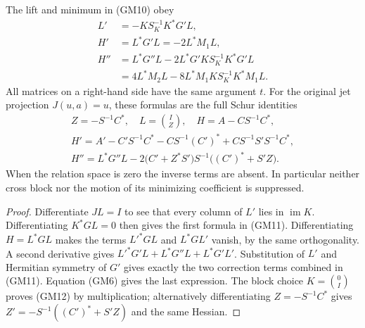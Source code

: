 \begin{theorem}
The lift and minimum in (GM10) obey
\begin{equation}\tag{GM11}
 \begin{split}
 L'&=-K S_K^{-1}K^*G'L,\\
 H'&=L^*G'L=-2L^*M_1L,\\
 H''&=L^*G''L-2L^*G'K S_K^{-1}K^*G'L\\
     &=4L^*M_2L-8L^*M_1K S_K^{-1}K^*M_1L.
 \end{split}
\end{equation}
All matrices on a right-hand side have the same argument $t$.
For the original jet projection $J(u,a)=u$, these formulas are the
full Schur identities
\begin{equation}\tag{GM12}
 \begin{gathered}
 Z=-S^{-1}C^*,\quad L=\binom{I}{Z},\quad H=A-CS^{-1}C^*,\\
 H'=A'-C'S^{-1}C^*-CS^{-1}(C')^*
                       +CS^{-1}S'S^{-1}C^*,\\
 H''=L^*G''L
     -2\bigl(C'+Z^*S'\bigr)S^{-1}\bigl((C')^*+S'Z\bigr).
 \end{gathered}
\end{equation}
When the relation space is zero the inverse terms are absent.
In particular neither cross block nor the motion of its minimizing
coefficient is suppressed.
\end{theorem}
\begin{proof}
Differentiate $JL=I$ to see that every column of $L'$ lies in
$\operatorname{im}K$.  Differentiating $K^*GL=0$ then gives the first
formula in (GM11).  Differentiating $H=L^*GL$ makes the terms
$L'^*GL$ and $L^*GL'$ vanish, by the same orthogonality.  A second
derivative gives $L'^*G'L+L^*G''L+L^*G'L'$.  Substitution of $L'$
and Hermitian symmetry of $G'$ gives exactly the two correction terms
combined in (GM11).  Equation (GM6) gives the last expression.
The block choice $K=\binom0I$ proves (GM12) by multiplication;
alternatively differentiating $Z=-S^{-1}C^*$ gives
$Z'=-S^{-1}((C')^*+S'Z)$ and the same Hessian.
\end{proof}


